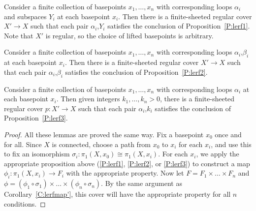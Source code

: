 \begin{prop}\label{P:lerf1'}

Consider a finite collection of basepoints $x_1,\dots,x_n$ with corresponding
loops $\alpha_i$ and subspaces $Y_i$ at each basepoint $x_i$. Then there is
a finite-sheeted regular cover $X' \to X$ such that each pair $\alpha_i$,$Y_i$
satisfies the conclusion of Proposition~\ref{P:lerf1}. Note that $X'$ is
regular, so the choice of lifted basepoints is arbitrary.

\end{prop}

\begin{prop}\label{P:lerf2'}

Consider a finite collection of basepoints $x_1,\dots,x_n$ with corresponding
loops $\alpha_i$,$\beta_i$ at each basepoint $x_i$. Then there is
a finite-sheeted regular cover $X' \to X$ such that each pair
$\alpha_i$,$\beta_i$ satisfies the conclusion of Proposition~\ref{P:lerf2}.

\end{prop}

\begin{prop}\label{P:lerf3'}

Consider a finite collection of basepoints $x_1,\dots,x_n$ with corresponding
loops $\alpha_i$ at each basepoint $x_i$. Then given integers
$k_1,\dots,k_n>0$, there is a finite-sheeted regular cover $p \colon X' \to X$
such that each pair $\alpha_i$,$k_i$ satisfies the conclusion of
Proposition~\ref{P:lerf3}.

\end{prop}

\begin{proof}

All these lemmas are proved the same way. Fix a basepoint $x_0$ once and for
all.  Since $X$ is connected, choose a path from $x_0$ to $x_i$ for each $x_i$,
and use this to fix an isomorphism $\sigma_i \colon \pi_1(X,x_0) \cong
\pi_1(X,x_i)$.  For each $x_i$, we apply the appropriate proposition above
(\ref{P:lerf1}, \ref{P:lerf2}, or \ref{P:lerf3}) to construct a map $\phi_i
\colon \pi_1(X,x_i) \to F_i$ with the appropriate property. Now let $F = F_1
\times \dots \times F_n$ and $\phi = (\phi_1 \circ \sigma_1) \times \dots
\times (\phi_n \circ \sigma_n)$.  By the same argument as
Corollary~\ref{C:lerfmap'}, this cover will have the appropriate property for
all $n$ conditions.

\end{proof}
